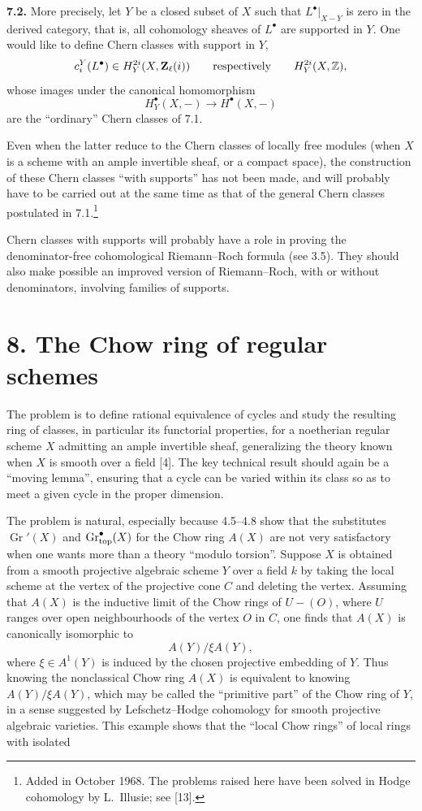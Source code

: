 \textbf{7.2.} More precisely, let $Y$ be a closed subset of $X$ such that
$L^\bullet|_{X-Y}$ is zero in the derived category, that is, all cohomology
sheaves of $L^\bullet$ are supported in $Y$. One would like to define Chern
classes with support in $Y$,
\[
 c_i^Y(L^\bullet)\in H_Y^{2i}(X,\mathbf Z_\ell(i))
 \qquad\text{respectively}\qquad
 H_Y^{2i}(X,\mathbb Z),
\]
whose images under the canonical homomorphism
\[
 H_Y^\bullet(X,-)\longrightarrow H^\bullet(X,-)
\]
are the ``ordinary'' Chern classes of 7.1.

Even when the latter reduce to the Chern classes of locally free modules
(when $X$ is a scheme with an ample invertible sheaf, or a compact space),
the construction of these Chern classes ``with supports'' has not been
made, and will probably have to be carried out at the same time as that of
the general Chern classes postulated in 7.1.\footnote{Added in October
1968. The problems raised here have been solved in Hodge cohomology by
L.~Illusie; see [13].}

Chern classes with supports will probably have a role in proving the
denominator-free cohomological Riemann--Roch formula (see 3.5). They should
also make possible an improved version of Riemann--Roch, with or without
denominators, involving families of supports.

\section*{8. The Chow ring of regular schemes}

The problem is to define rational equivalence of cycles and study the
resulting ring of classes, in particular its functorial properties, for a
noetherian regular scheme $X$ admitting an ample invertible sheaf,
generalizing the theory known when $X$ is smooth over a field [4]. The key
technical result should again be a ``moving lemma'', ensuring that a cycle
can be varied within its class so as to meet a given cycle in the proper
dimension.

The problem is natural, especially because 4.5--4.8 show that the
substitutes $\operatorname{Gr}'(X)$ and $\operatorname{Gr}_{\mathrm{top}}^\bullet(X)$ for the Chow ring
$A(X)$ are not very satisfactory when one wants more than a theory
``modulo torsion''. Suppose $X$ is obtained from a smooth projective
algebraic scheme $Y$ over a field $k$ by taking the local scheme at the
vertex of the projective cone $C$ and deleting the vertex. Assuming that
$A(X)$ is the inductive limit of the Chow rings of $U-(O)$, where $U$
ranges over open neighbourhoods of the vertex $O$ in $C$, one finds that
$A(X)$ is canonically isomorphic to
\[
 A(Y)/\xi A(Y),
\]
where $\xi\in A^1(Y)$ is induced by the chosen projective embedding of $Y$.
Thus knowing the nonclassical Chow ring $A(X)$ is equivalent to knowing
$A(Y)/\xi A(Y)$, which may be called the ``primitive part'' of the Chow
ring of $Y$, in a sense suggested by Lefschetz--Hodge cohomology for smooth
projective algebraic varieties. This example shows that the ``local Chow
rings'' of local rings with isolated

